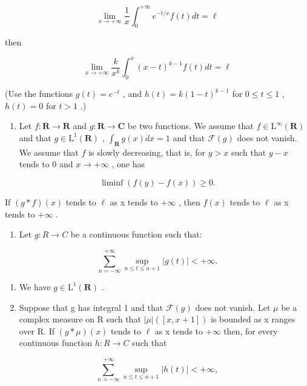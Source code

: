 \[
\lim _ {x \to + \infty} \frac {1}{x} \int_ {0} ^ {+ \infty} e ^ {- t / x} f (t) d t = \ell
\]

then

\[
\lim _ {x \rightarrow + \infty} \frac {k}{x ^ {k}} \int_ {0} ^ {x} (x - t) ^ {k - 1} f (t) d t = \ell
\]

(Use the functions \(g(t) = e^{-t}\) , and \(h(t) = k(1 - t)^{k-1}\) for \(0 \leqslant t \leqslant 1\) , \(h(t) = 0\) for \(t > 1\) .)

\begin{enumerate}
\def\labelenumi{\arabic{enumi})}
\setcounter{enumi}{5}
\tightlist
\item
  Let \(f \colon \mathbf{R} \to \mathbf{R}\) and \(g: \mathbf{R} \to \mathbf{C}\) be two functions. We assume that \(f \in \mathrm{L}^{\infty}(\mathbf{R})\) and that \(g \in \mathrm{L}^{1}(\mathbf{R})\) , \(\int_{\mathbf{R}} g(x) dx = 1\) and that \(\mathcal{F}(g)\) does not vanish. We assume that \(f\) is slowly decreasing, that is, for \(y > x\) such that \(y - x\) tends to 0 and \(x \to +\infty\) , one has
\end{enumerate}

\[
\liminf (f (y) - f (x)) \geqslant 0.
\]

If \((g*f)(x)\) tends to \(\ell\) as x tends to \(+\infty\) , then \(f(x)\) tends to \(\ell\) as x tends to \(+\infty\) .

\begin{enumerate}
\def\labelenumi{\arabic{enumi})}
\setcounter{enumi}{6}
\tightlist
\item
  Let \(g: R \rightarrow C\) be a continuous function such that:
\end{enumerate}

\[
\sum_ {n = - \infty} ^ {+ \infty} \sup _ {n \leqslant t \leqslant n + 1} | g (t) | <   + \infty .
\]

\begin{enumerate}
\def\labelenumi{\alph{enumi})}
\item
  We have \(g \in \mathrm{L}^{1}(\mathbf{R})\) .
\item
  Suppose that g has integral 1 and that \(\mathcal{F}(g)\) does not vanish. Let \(\mu\) be a complex measure on R such that \(|\mu|([x,x+1])\) is bounded as x ranges over R. If \((g*\mu)(x)\) tends to \(\ell\) as x tends to \(+\infty\) then, for every continuous function \(h:R\to C\) such that
\end{enumerate}

\[
\sum_ {n = - \infty} ^ {+ \infty} \sup _ {n \leqslant t \leqslant n + 1} | h (t) | <   + \infty ,
\]

